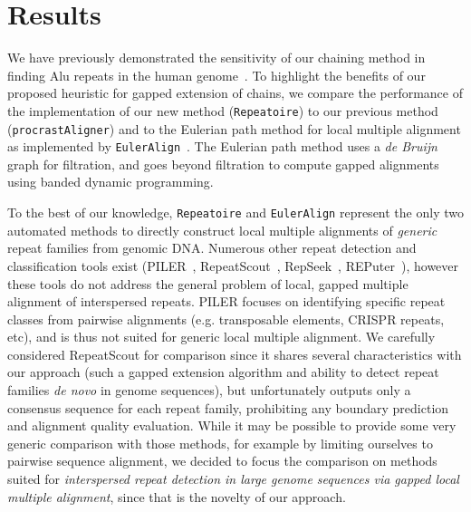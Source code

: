 \documentclass[12pt,journal,letterpaper,onecolumn, draftcls]{IEEEtran}
\begin{document}
\section{Results}
We have previously demonstrated the sensitivity of our chaining method
in finding Alu repeats in the human
genome~\cite{ref-procrast}. To highlight the benefits of our proposed
heuristic for gapped extension of chains, we compare the performance of the implementation of our new method (\texttt{Repeatoire}) to our previous method (\texttt{procrastAligner}) and to the Eulerian path method for local multiple alignment
as implemented by \texttt{EulerAlign}~\cite{ref-related1}. The Eulerian
path method uses a \textit{de Bruijn} graph for filtration, and goes
beyond filtration to compute gapped alignments using banded dynamic
programming.

To the best of our knowledge, \texttt{Repeatoire} and
\texttt{EulerAlign} represent the only two automated methods to directly
construct local multiple alignments of \emph{generic} repeat families from genomic DNA.
Numerous other repeat detection and classification tools exist (PILER~\cite{ref-piler}, RepeatScout~\cite{repeatscout}, RepSeek~\cite{repseek}, REPuter~\cite{ref-reputer}), however these tools do not address the general problem of local, gapped multiple alignment of interspersed repeats.  PILER focuses on identifying specific repeat classes from pairwise alignments (e.g. transposable elements, CRISPR repeats, etc), and is thus not suited for generic local multiple alignment. We carefully considered RepeatScout for comparison since it shares several characteristics with our approach (such a gapped extension algorithm and ability to detect repeat families \emph{de novo} in genome sequences), but unfortunately outputs only a consensus sequence for each repeat family, prohibiting any boundary prediction and alignment quality evaluation.  While it may be possible to provide some very generic comparison with those methods, for example by limiting ourselves to pairwise sequence alignment, we decided to focus the comparison on methods suited for \emph{interspersed repeat detection in large genome sequences via gapped local multiple alignment}, since that is the novelty of our approach.
\end{document}
